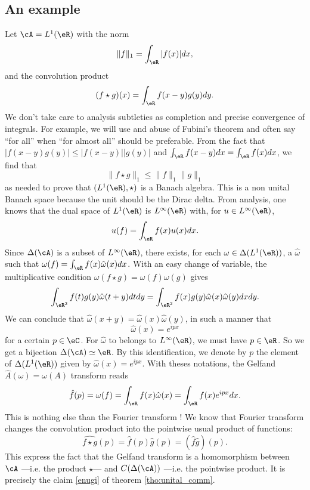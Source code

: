 \subsection{An example}

Let $\cA=L^1(\eR)$ with the norm
\[
  \|f\|_1=\int_{\eR}|f(x)|dx,
\]
and the convolution product
\[
   (f\star g)(x)=\int_{\eR}f(x-y)g(y)dy.
\]
We don't take care to analysis subtleties as completion and precise convergence of integrals. For example, we will use and abuse of Fubini's theorem and often say ``for all'' when ``for almost all'' should be preferable. From the fact that $|f(x-y)g(y)|\leq|f(x-y)||g(y)|$ and $\int_{\eR}f(x-y)dx=\int_{\eR}f(x)dx$, we find that 
\[
   \|f\star g\|_1\leq \|f\|_1\|g\|_1
\]
as needed to prove that $(L^1(\eR),\star)$ is a Banach algebra. This is a non unital Banach space because the unit should be the Dirac delta. From analysis, one knows that the dual space of $L^1(\eR)$ is $L^{\infty}(\eR)$ with, for $u\in L^{\infty}(\eR)$,
\[
  u(f)=\int_{\eR}f(x)u(x)dx.
\]
Since $\Delta(\cA)$ is a subset of $L^{\infty}(\eR)$, there exists, for each $\omega\in\Delta(L^1(\eR))$, a $\hat{\omega}$ such that $\omega(f)=\int_{\eR}f(x)\hat{\omega}(x)dx$. With an easy change of variable, the multiplicative condition $\omega(f\star g)=\omega(f)\omega(g)$ gives
\[ 
\int_{\eR^2}f(t)g(y)\hat{\omega}(t+y)dtdy=\int_{\eR^2}f(x)g(y)\hat{\omega}(x)\hat{\omega}(y)dxdy.
\]
We can conclude that $\hat{\omega}(x+y)=\hat{\omega}(x)\hat{\omega}(y)$, in such a manner that
\[ 
\hat{\omega}(x)=e^{ipx}
\]
for a certain $p\in\eC$. For $\hat{\omega}$ to belongs to $L^{\infty}(\eR)$, we must have $p\in\eR$. So we get a bijection $\Delta(\cA)\simeq\eR$. By this identification, we denote by $p$ the element of $\Delta(L^1(\eR))$ given by $\hat{\omega}(x)=e^{ipx}$. With theses notations, the Gelfand $\hat A(\omega)=\omega(A)$ transform reads
\begin{equation}
  \hat f(p)=\omega(f)=\int_{\eR}f(x)\hat{\omega}(x)
                     =\int_{\eR}f(x)e^{ipx}dx.
\end{equation}
This is nothing else than the Fourier transform ! We know that Fourier transform changes the convolution product into the pointwise usual product of functions:
\[ 
\widehat{f\star g}(p)=\hat f(p)\hat g(p)=(\hat f\hat g)(p).
\]
This express the fact that the Gelfand transform is a homomorphism between $\cA$ ---i.e. the product $\star$--- and $C(\Delta(\cA))$ ---i.e. the pointwise product. It is precisely the claim \ref{enugi} of theorem  \ref{tho:unital_comm}. 


